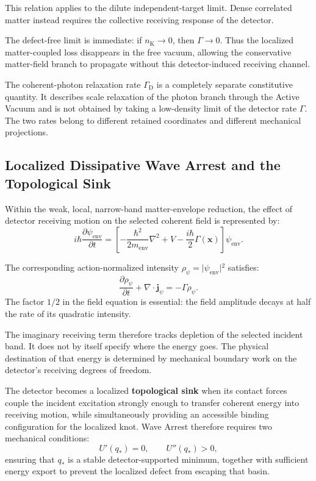 This relation applies to the dilute independent-target limit. Dense correlated matter instead requires the collective receiving response of the detector.

The defect-free limit is immediate: if $n_{\mathrm K} \longrightarrow 0$, then $\Gamma \longrightarrow 0$. Thus the localized matter-coupled loss disappears in the free vacuum, allowing the conservative matter-field branch to propagate without this detector-induced receiving channel. 

The coherent-photon relaxation rate $\Gamma_{\mathrm D}$ is a completely separate constitutive quantity. It describes scale relaxation of the photon branch through the Active Vacuum and is not obtained by taking a low-density limit of the detector rate $\Gamma$. The two rates belong to different retained coordinates and different mechanical projections.

\subsection{Localized Dissipative Wave Arrest and the Topological Sink}

Within the weak, local, narrow-band matter-envelope reduction, the effect of detector receiving motion on the selected coherent field is represented by:
\begin{equation}
    i\hbar
    \frac{\partial\psi_{\mathrm{env}}}{\partial t}
    =
    \left[
        -\frac{\hbar^2}{2m_{\mathrm{env}}}\nabla^2
        +V
        -\frac{i\hbar}{2}\Gamma(\mathbf{x})
    \right]
    \psi_{\mathrm{env}}.
\end{equation}

The corresponding action-normalized intensity $\rho_{\psi} = \vert{}\psi_{\mathrm{env}}\vert{}^2$ satisfies:
\begin{equation}
    \frac{\partial\rho_{\psi}}{\partial t}
    +
    \nabla\cdot\mathbf{j}_{\psi}
    =
    -\Gamma\rho_{\psi}.
\end{equation}
The factor $1/2$ in the field equation is essential: the field amplitude decays at half the rate of its quadratic intensity.

The imaginary receiving term therefore tracks depletion of the selected incident band. It does not by itself specify where the energy goes. The physical destination of that energy is determined by mechanical boundary work on the detector's receiving degrees of freedom.

The detector becomes a localized \textbf{topological sink} when its contact forces couple the incident excitation strongly enough to transfer coherent energy into receiving motion, while simultaneously providing an accessible binding configuration for the localized knot. Wave Arrest therefore requires two mechanical conditions:
\begin{equation}
    U'(q_\ast) = 0, \qquad U''(q_\ast) > 0,
\end{equation}
ensuring that $q_\ast$ is a stable detector-supported minimum, together with sufficient energy export to prevent the localized defect from escaping that basin.


